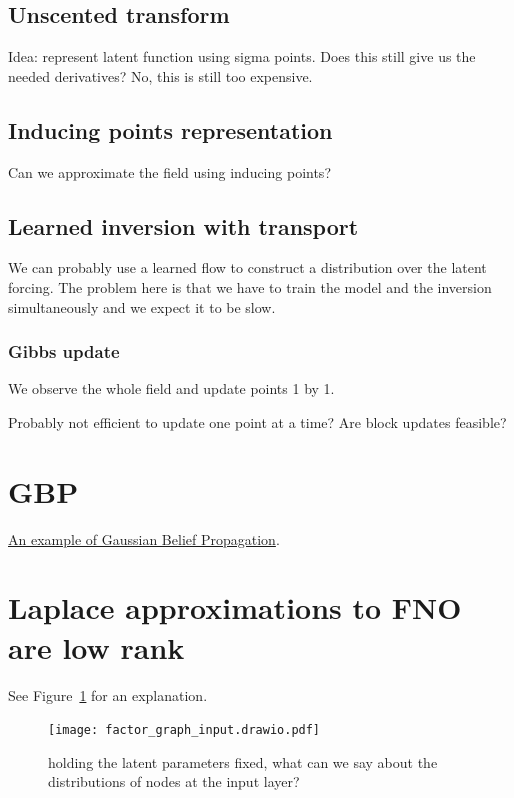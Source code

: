\documentclass{article}
\begin{document}
\subsection{Unscented transform}

Idea: represent latent function using sigma points.
Does this still give us the needed derivatives?
No, this is still too expensive.

\subsection{Inducing points representation}

Can we approximate the field using inducing points?

\subsection{Learned inversion with transport}

We can probably use a learned flow to construct a distribution over the latent forcing.
The problem here is that we have to train the model and the inversion simultaneously and we expect it to be slow.

\subsubsection{Gibbs update}
We observe the whole field and update points 1 by 1.

Probably not efficient to update one point at a time?
Are block updates feasible?





\appendix

\section{GBP}


\href{https://github.com/joeaortiz/gbp/blob/master/gbp/gbp.py}{An example of Gaussian Belief Propagation}.

\section{Laplace approximations to FNO are low rank}\label{sec:fn_laplace_low_rank}

See Figure~\ref{fig:groundwaterdag} for an explanation.
\begin{figure}[!htb]
  \centering
  \texttt{[image: factor\_graph\_input.drawio.pdf]}
  \caption{holding the latent parameters fixed, what can we say about the distributions of nodes at the input layer?}\label{fig:groundwaterdag}
\end{figure}
\end{document}
